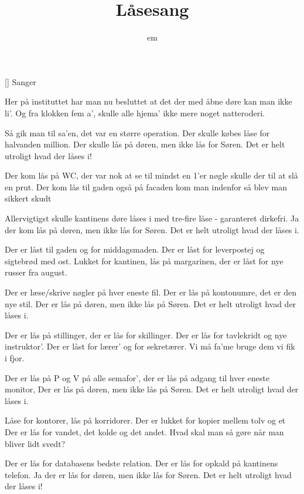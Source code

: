 \documentclass[a4paper,11pt]{article}
\title{Låsesang}
\author{em}
\begin{document}
\maketitle

\begin{roles}
[] Sanger
\end{roles}

\begin{song}
  Her på instituttet
  har man nu besluttet
  at det der med åbne døre kan man ikke li'.
  Og fra klokken fem a',
  skulle alle hjema'
  ikke mere noget natteroderi.

  Så gik man til sa'en, det var en større operation.
  Der skulle købes låse for halvanden million.
  Der skulle lås på døren,
men ikke lås for Søren.
Det er helt utroligt hvad der låses i!

Der kom lås på WC,
der var nok at se til
mindst en 1'er nøgle skulle der til at slå en prut.
Der kom lås til gaden
også på facaden
kom man indenfor så blev man sikkert skudt

Allervigtigst skulle kantinens døre låses i
med tre-fire låse - garanteret dirkefri.
Ja der kom lås på døren,
men ikke lås for Søren.
Det er helt utroligt hvad der låses i.

Der er låst til gaden
og for middagsmaden.
Der er låst for leverpostej og sigtebrød med ost.
Lukket for kantinen, lås på margarinen,
der er låst for nye russer fra august.

Der er læse/skrive nøgler på hver eneste fil.
Der er lås på kontonumre, det er den nye stil.
Der er lås på døren,
men ikke lås på Søren.
Det er helt utroligt hvad der låses i.

Der er lås på stillinger,
der er lås for skillinger.
Der er lås for tavlekridt og nye instruktor'.
Der er låst for lærer'
og for sekretærer.
Vi må fa'me bruge dem vi fik i fjor.

Der er lås på P og V på alle semafor',
der er lås på adgang til hver eneste monitor,
Der er lås på døren,
men ikke lås på Søren.
Det er helt utroligt hvad der låses i.

Låse for kontorer,
lås på korridorer.
Der er lukket for kopier mellem tolv og et
Der er lås for vandet,
det kolde og det andet.
Hvad skal man så gøre når man bliver lidt svedt?

Der er lås for databasens bedste relation.
Der er lås for opkald på kantinens telefon.
Ja der er lås for døren,
men ikke lås for Søren.
Det er helt utroligt hvad der låses i!

\end{song}
\end{document}
